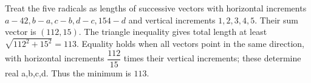 Treat the five radicals as lengths of successive vectors with horizontal increments $a-42,b-a,c-b,d-c,154-d$ and vertical increments $1,2,3,4,5$. Their sum vector is $(112,15)$. The triangle inequality gives total length at least $\sqrt{112^2+15^2}=113$. Equality holds when all vectors point in the same direction, with horizontal increments $\dfrac{112}{15}$ times their vertical increments; these determine real a,b,c,d. Thus the minimum is $\boxed{113}$.
